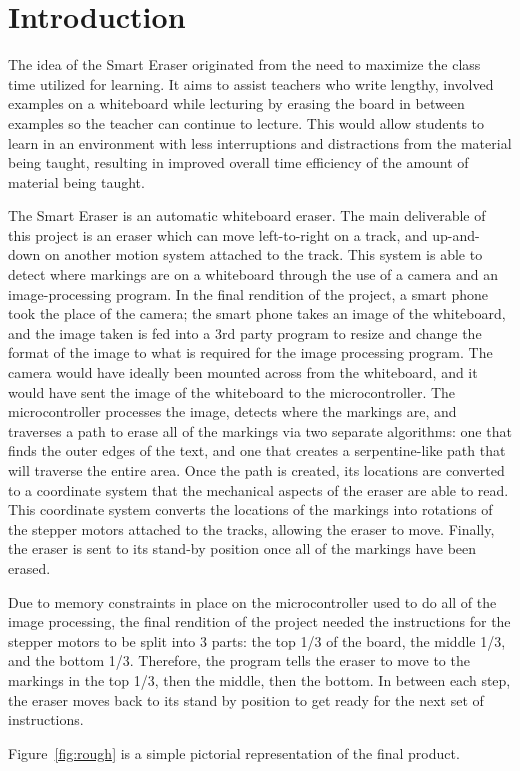  \section{Introduction}
 The idea of the Smart Eraser originated from the need to maximize the class time utilized for learning. It aims to assist teachers who write lengthy, involved examples on a whiteboard while lecturing by erasing the board in between examples so the teacher can continue to lecture. This would allow students to learn in an environment with less interruptions and distractions from the material being taught, resulting in improved overall time efficiency of the amount of material being taught.
 \par
\setlength{\parindent}{2.5ex}The Smart Eraser is an automatic whiteboard eraser. The main deliverable of this project is an eraser which can move left-to-right on a track, and up-and-down on another motion system attached to the track. This system is able to detect where markings are on a whiteboard through the use of a camera and an image-processing program. In the final rendition of the project, a smart phone took the place of the camera; the smart phone takes an image of the whiteboard, and the image taken is fed into a 3rd party program to resize and change the format of the image to what is required for the image processing program. The camera would have ideally been mounted across from the whiteboard, and it would have sent the image of the whiteboard to the microcontroller. The microcontroller processes the image, detects where the markings are, and traverses a path to erase all of the markings via two separate algorithms: one that finds the outer edges of the text, and one that creates a serpentine-like path that will traverse the entire area. Once the path is created, its locations are converted to a coordinate system that the mechanical aspects of the eraser are able to read. This coordinate system converts the locations of the markings into rotations of the stepper motors attached to the tracks, allowing the eraser to move. Finally, the eraser is sent to its stand-by position once all of the markings have been erased. \par
\setlength{\parindent}{2.5ex}Due to memory constraints in place on the microcontroller used to do all of the image processing, the final rendition of the project needed the instructions for the stepper motors to be split into 3 parts: the top 1/3 of the board, the middle 1/3, and the bottom 1/3. Therefore, the program tells the eraser to move to the markings in the top 1/3, then the middle, then the bottom. In between each step, the eraser moves back to its stand by position to get ready for the next set of instructions. 
\newpage
\par
\setlength{\parindent}{2.5ex}Figure~\ref{fig:rough} is a simple pictorial representation of the final product.

